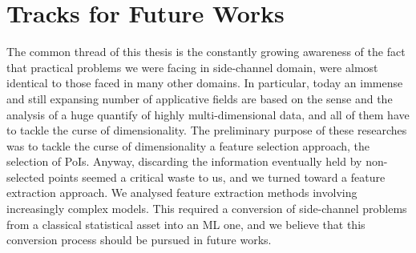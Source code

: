 \section{Tracks for Future Works}

The common thread of this thesis is the constantly growing awareness of the fact that practical problems we were facing in side-channel domain, were almost identical to those faced in many other domains. In particular, today an immense and still expansing number of applicative fields are based on the sense and the analysis of a huge quantify of highly multi-dimensional data, and all of them have to tackle the curse of dimensionality. The preliminary purpose of these researches was to tackle the curse of dimensionality \via a feature selection approach, \ie the selection of PoIs. Anyway, discarding the information eventually held by non-selected points seemed a critical waste to us, and we turned toward a feature extraction approach. We analysed feature extraction methods involving increasingly complex models. This required a conversion of side-channel problems from a classical statistical asset into an ML one, and we believe that this conversion process should be pursued in future works.\\




